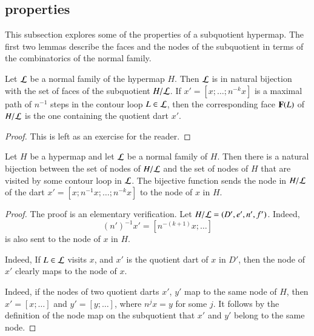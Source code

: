 \figWMWCTGH   %


\subsection{properties}

This subsection explores some of the properties of a subquotient hypermap.
The first two lemmas describe the faces and the nodes of the subquotient
in terms of the combinatorics of the normal family.

\begin{lemma}\label{lemma:subquotient-bijection}
  Let ${\cal L}$ be a normal family of the hypermap $H$.  Then ${\cal
    L}$ is in natural bijection with the set of faces of the subquotient
  $H/{\cal L}$.  If $x'=[x;\ldots;n^{-k}x]$ is a maximal path of
  $n^{-1}$ steps in the contour loop $L\in{\cal L}$, then the
  corresponding face ${\mathbf F}(L)$ of $H/{\cal L}$ is the
  one containing the quotient dart $x'$.
\end{lemma}
%

\begin{proof}  This is left as an exercise for the reader.
\end{proof}


\begin{lemma}\label{lemma:subquotient-node}
Let $H$ be a hypermap and let ${\cal L}$ be a normal family of $H$.
Then there is a natural bijection between  the set of nodes of
$H/{\cal L}$ and the set of nodes of $H$ that
are visited by some contour loop in ${\cal L}$.   
The bijective function sends the node in $H/{\cal L}$ of 
the dart $x' = [x;n^{-1} x;\ldots;n^{-k}x]$ to the node of $x$ in $H$.
\end{lemma}

\begin{proof}  The proof is an elementary verification.
Let $H/{\cal L} = (D',e',n',f')$.
  Indeed, 
 \[ 
(n')^{-1} x' = [n^{-(k+1)} x;\ldots]
\] 
 is also sent to the node of $x$ in $H$.

  Indeed,
If $L\in {\cal L}$ visits $x$,  and $x'$ is the quotient dart of $x$ in $D'$,
then the node of $x'$ clearly maps to the node of $x$.  

  Indeed, if the nodes of
two quotient darts $x'$, $y'$ map to the same node of $H$, then
$x'=[x;\ldots]$ and $y'=[y;\ldots]$, where $n^j x = y$ for some $j$.
It follows by the definition of the node map on the subquotient that
$x'$ and $y'$ belong to the same node.
\end{proof}

